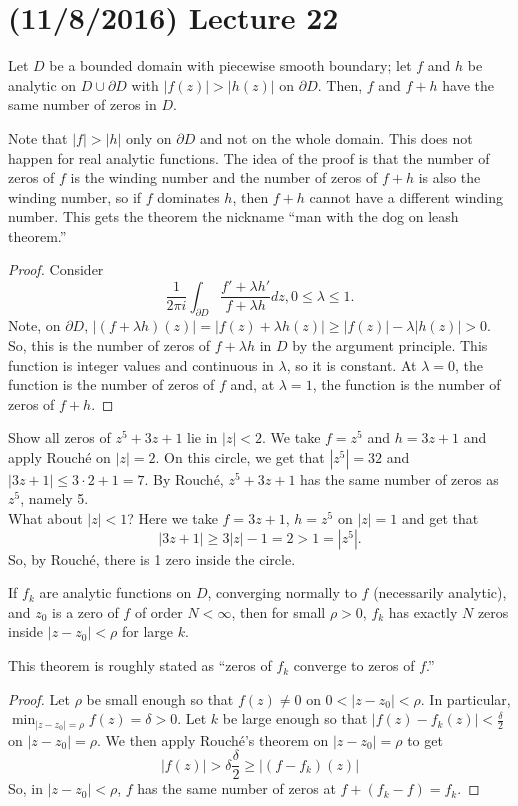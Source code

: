 \documentclass[11pt,leqno,oneside]{amsart}
\numberwithin{thm}{section}
\begin{document}
  \section{(11/8/2016) Lecture 22}
  \begin{thm}
    Let $D$ be a bounded domain with piecewise smooth boundary; let
    $f$ and $h$ be analytic on $D \cup \partial D$ with $|f(z)| >
    |h(z)|$ on $\partial D$. Then, $f$ and $f+h$ have the same number
    of zeros in $D$.
  \end{thm}
  Note that $|f| > |h|$ only on $\partial D$ and not on the whole
  domain. This does not happen for real analytic functions. The idea
  of the proof is that the number of zeros of $f$ is the winding
  number and the number of zeros of $f+h$ is also the winding number,
  so if $f$ dominates $h$, then $f+h$ cannot have a different winding
  number. This gets the theorem the nickname ``man with the dog on
  leash theorem.''
  \begin{proof}
    Consider \[
      \frac{1}{2\pi i} \int_{\partial D} \frac{f'+\lambda h'}{f +
        \lambda h} dz, 0 \leq \lambda \leq 1.
    \]
    Note, on $\partial D$, $|(f+\lambda h)(z)| = |f(z) + \lambda h(z)|
    \geq |f(z)| - \lambda |h(z)| > 0$. So, this is the number of zeros
    of $f+\lambda h$ in $D$ by the argument principle. This function
    is integer values and continuous in $\lambda$, so it is
    constant. At $\lambda = 0$, the function is the number of zeros of
    $f$ and, at $\lambda = 1$, the function is the number of zeros of
    $f+h$.
  \end{proof}
  \begin{example}
    Show all zeros of $z^5+3z+1$ lie in $|z| < 2$. We take $f=z^5$ and
    $h=3z+1$ and apply Rouch\'{e} on $|z| = 2$. On this circle, we
    get that $|z^5| = 32$ and $|3z+1| \leq 3\cdot 2 + 1 = 7$. By
    Rouch\'{e}, $z^5+3z+1$ has the same number of zeros as $z^5$,
    namely 5. \\

    What about $|z|<1$? Here we take $f = 3z+1$, $h = z^5$ on $|z|=1$
    and get that \[
      |3z+1| \geq 3|z|-1 = 2 > 1 = |z^5|.
    \]
    So, by Rouch\'{e}, there is 1 zero inside the circle.
  \end{example}
  \begin{thm}
    If $f_k$ are analytic functions on $D$, converging normally to
    $f$ (necessarily analytic), and $z_0$ is a zero of $f$ of order $N
    < \infty$, then for small $\rho > 0$, $f_k$ has exactly $N$ zeros
    inside $|z-z_0| < \rho$ for large $k$.
  \end{thm}
  This theorem is roughly stated as ``zeros of $f_k$ converge to zeros
  of $f$.''
  \begin{proof}
    Let $\rho$ be small enough so that $f(z) \neq 0$ on $0 < |z-z_0| <
    \rho$. In particular, $\min_{|z-z_0|=\rho} f(z) = \delta > 0$. Let $k$ be large
    enough so that $|f(z) - f_k(z)| < \frac{\delta}{2}$ on $|z-z_0| =
    \rho$. We then apply Rouch\'{e}'s theorem on $|z-z_0| = \rho$ to
    get \[
      |f(z)| > \delta \frac{\delta}{2} \geq |(f-f_k)(z)|
   \]
   So, in $|z-z_0| < \rho$, $f$ has the same number of zeros at
   $f+(f_k-f) = f_k$.
  \end{proof}
\end{document}

